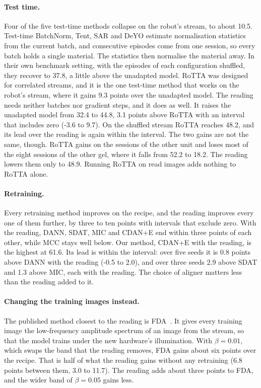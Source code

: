 \paragraph{Test time.}
Four of the five test-time methods collapse on the robot's stream, to about 10.5\pct. Test-time BatchNorm, Tent, SAR and DeYO estimate normalisation statistics from the current batch, and consecutive episodes come from one session, so every batch holds a single material. The statistics then normalise the material away. In their own benchmark setting, with the episodes of each configuration shuffled, they recover to 37.8\pct, a little above the unadapted model. RoTTA was designed for correlated streams, and it is the one test-time method that works on the robot's stream, where it gains 9.3 points over the unadapted model. The reading needs neither batches nor gradient steps, and it does as well. It raises the unadapted model from 32.4 to 44.8\pct, 3.1 points above RoTTA with an interval that includes zero (-3.6 to 9.7). On the shuffled stream RoTTA reaches 48.2\pct, and its lead over the reading is again within the interval. The two gains are not the same, though. RoTTA gains on the sessions of the other unit and loses most of the eight sessions of the other gel, where it falls from 52.2 to 18.2\pct. The reading lowers them only to 48.9\pct. Running RoTTA on read images adds nothing to RoTTA alone.

\paragraph{Retraining.}
Every retraining method improves on the recipe, and the reading improves every one of them further, by three to ten points with intervals that exclude zero. With the reading, DANN, SDAT, MIC and CDAN+E end within three points of each other, while MCC stays well below. Our method, CDAN+E with the reading, is the highest at 61.6\pct. Its lead is within the interval: over five seeds it is 0.8 points above DANN with the reading (-0.5 to 2.0), and over three seeds 2.9 above SDAT and 1.3 above MIC, each with the reading. The choice of aligner matters less than the reading added to it.

\paragraph{Changing the training images instead.}
The published method closest to the reading is FDA~\cite{fda2020}. It gives every training image the low-frequency amplitude spectrum of an image from the stream, so that the model trains under the new hardware's illumination. With $\beta=0.01$, which swaps the band that the reading removes, FDA gains about six points over the recipe. That is half of what the reading gains without any retraining (6.8 points between them, 3.0 to 11.7). The reading adds about three points to FDA, and the wider band of $\beta=0.05$ gains less.

